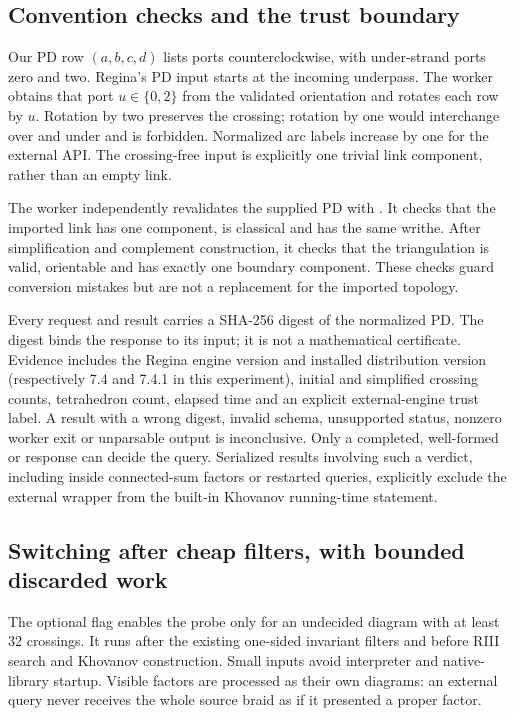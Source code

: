 \subsection{Convention checks and the trust boundary}

Our PD row $(a,b,c,d)$ lists ports counterclockwise, with under-strand ports
zero and two.  Regina's PD input starts at the incoming underpass.  The
worker obtains that port $u\in\{0,2\}$ from the validated orientation and
rotates each row by $u$.  Rotation by two preserves the crossing; rotation
by one would interchange over and under and is forbidden.  Normalized arc
labels increase by one for the external API.  The crossing-free input is
explicitly one trivial link component, rather than an empty link.

The worker independently revalidates the supplied PD with
.  It checks that the imported link has one
component, is classical and has the same writhe.  After simplification and
complement construction, it checks that the triangulation is valid,
orientable and has exactly one boundary component.  These checks guard
conversion mistakes but are not a replacement for the imported topology.

Every request and result carries a SHA-256 digest of the normalized PD.
The digest binds the response to its input; it is not a mathematical
certificate.  Evidence includes the Regina engine version and installed
distribution version (respectively 7.4 and 7.4.1 in this experiment), initial
and simplified crossing counts, tetrahedron count, elapsed time and an
explicit external-engine trust label.  A result with a wrong digest,
invalid schema, unsupported status, nonzero worker exit or unparsable output
is inconclusive.  Only a completed, well-formed  or
 response can decide the query.  Serialized results involving
such a verdict, including inside connected-sum factors or restarted
queries, explicitly exclude the external wrapper from the built-in
Khovanov running-time statement.

\subsection{Switching after cheap filters, with bounded discarded work}

The optional  flag enables the probe only for an undecided
diagram with at least 32 crossings.  It runs after the existing one-sided
invariant filters and before RIII search and Khovanov construction.  Small
inputs avoid interpreter and native-library startup.  Visible factors are
processed as their own diagrams: an external query never receives the
whole source braid as if it presented a proper factor.

